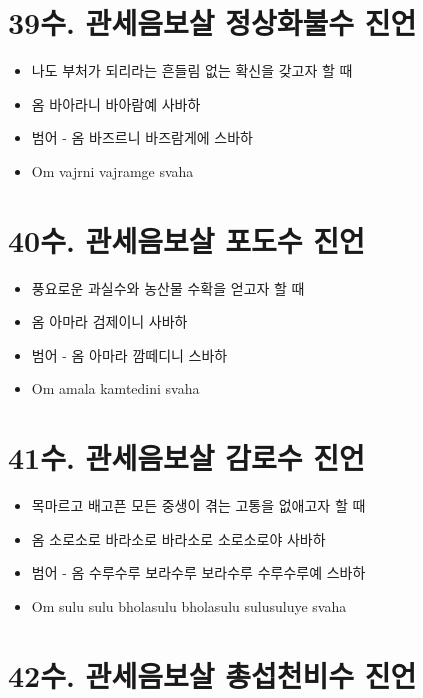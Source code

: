 \documentclass[12pt, a4paper, oneside]{book}
\let\stdsection\section
\renewcommand\section{\newpage\stdsection}
\begin{document}
\section{39수. 관세음보살 정상화불수 진언}

	 		\begin{itemize}
			\item 나도 부처가 되리라는 흔들림 없는 확신을 갖고자 할 때
			\item 옴 바아라니 바아람예 사바하
			\item 범어 - 옴 바즈르니 바즈람게에 스바하
			\item Om vajrni vajramge svaha
			\end{itemize}





\section{40수. 관세음보살 포도수 진언}

	 		\begin{itemize}
			\item 풍요로운 과실수와 농산물 수확을 얻고자 할 때
			\item 옴 아마라 검제이니 사바하
			\item 범어 - 옴 아마라 깜떼디니 스바하
			\item Om amala kamtedini svaha
			\end{itemize}





\section{41수. 관세음보살 감로수 진언}

	 		\begin{itemize}
			\item 목마르고 배고픈 모든 중생이 겪는 고통을 없애고자 할 때
			\item 옴 소로소로 바라소로 바라소로 소로소로야 사바하
			\item 범어 - 옴 수루수루 보라수루 보라수루 수루수루예 스바하
			\item Om sulu sulu bholasulu bholasulu sulusuluye svaha
			\end{itemize}





\section{42수. 관세음보살 총섭천비수 진언}
\end{document}
